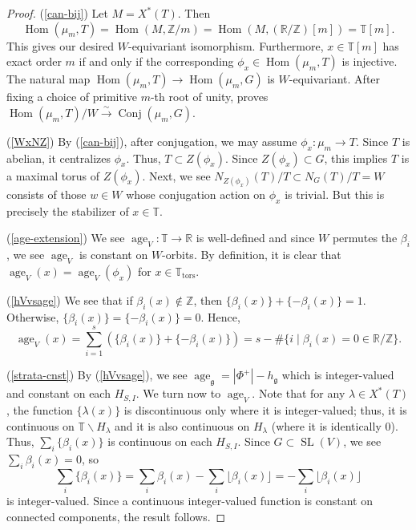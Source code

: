 \documentclass[12pt,a4paper]{amsart}
\theoremstyle{definition}
\renewcommand{\setminus}{\smallsetminus}
\newcommand{\TT}{\mathbb T}
\newcommand{\ZZ}{\mathbb{Z}}
\newcommand{\RR}{\mathbb{R}}
\newcommand{\g}{\mathfrak{g}}
\renewcommand{\1}{\textbf{1}}
\newcommand{\<}{\langle}
\renewcommand{\>}{\rangle}
\DeclareMathOperator{\age}{age}
\DeclareMathOperator{\Hom}{Hom}
\DeclareMathOperator{\tors}{tors}
\DeclareMathOperator{\SL}{SL}
\DeclareMathOperator{\Conj}{Conj}
\begin{document}
\begin{proof}
	(\ref{can-bij}) Let $M=X^*(T)$. Then
	\[
		\Hom(\mu_m,T)=\Hom(M,\ZZ/m)=\Hom(M,(\RR/\ZZ)[m])=\TT[m].
	\]
	This gives our desired $W$-equivariant isomorphism. Furthermore, $x\in\TT[m]$ has exact order $m$ if and only if the corresponding $\phi_x\in\Hom(\mu_m,T)$ is injective. The natural map $\Hom(\mu_m,T)\to \Hom(\mu_m,G)$ is $W$-equivariant. After fixing a choice of primitive $m$-th root of unity, \cite[Proposition 14.6]{MalleTesterman2011} proves $\Hom(\mu_m,T)/W\xrightarrow{\sim}\Conj(\mu_m,G)$.
	
	(\ref{WxNZ}) By (\ref{can-bij}), after conjugation, we may assume $\phi_x\colon\mu_m\to T$. Since $T$ is abelian, it centralizes $\phi_x$. Thus, $T\subset Z(\phi_x)$. Since $Z(\phi_x)\subset G$, this implies $T$ is a maximal torus of $Z(\phi_x)$. Next, we see $N_{Z(\phi_x)}(T)/T\subset N_G(T)/T=W$ consists of those $w\in W$ whose conjugation action on $\phi_x$ is trivial. But this is precisely the stabilizer of $x\in\TT$.
	
	(\ref{age-extension}) We see $\age_V\colon\TT\to\RR$ is well-defined and since $W$ permutes the $\beta_i$, we see $\age_V$ is constant on $W$-orbits. By definition, it is clear that $\age_V(x)=\age_V(\phi_x)$ for $x\in\TT_{\tors}$.

	(\ref{hVvsage}) We see that if $\beta_i(x)\notin\ZZ$, then $\{\beta_i(x)\}+\{-\beta_i(x)\}=1$. Otherwise, $\{\beta_i(x)\}=\{-\beta_i(x)\}=0$. Hence,
	\[
		\age_V(x) =\sum_{i=1}^s \left(\{\beta_i(x)\}+\{-\beta_i(x)\}\right)=s-\#\{i\mid \beta_i(x)=0\in\RR/\ZZ\}.
	\]
	
	(\ref{strata-cnst}) By (\ref{hVvsage}), we see $\age_\g=|\Phi^+|-h_\g$ which is integer-valued and constant on each $H_{S,I}$. We turn now to $\age_V$. Note that for any $\lambda\in X^*(T)$, the function $\{\lambda(x)\}$ is discontinuous only where it is integer-valued; thus, it is continuous on $\TT\setminus H_\lambda$ and it is also continuous on $H_\lambda$ (where it is identically $0$). Thus, $\sum_i\{\beta_i(x)\}$ is continuous on each $H_{S,I}$. Since $G\subset\SL(V)$, we see $\sum_i\beta_i(x)=0$, so 
	\[
		\sum_i\{\beta_i(x)\}=\sum_i\beta_i(x)-\sum_i\lfloor\beta_i(x)\rfloor=-\sum_i\lfloor\beta_i(x)\rfloor
	\]
	is integer-valued. Since a continuous integer-valued function is constant on connected components, the result follows.
\end{proof}


	

	
	
\end{document}
